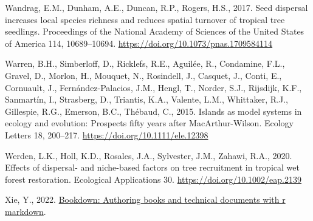 \documentclass[
  12pt,
]{article}
\newlength{\cslhangindent}
\newlength{\cslentryspacingunit} %
\newenvironment{CSLReferences}[2] %
 {%
  \setlength{\parindent}{0pt}
  \ifodd #1
  \let\oldpar\par
  \def\par{\hangindent=\cslhangindent\oldpar}
  \fi
  \setlength{\parskip}{#2\cslentryspacingunit}
 }%
 {}
\begin{document}
\begin{CSLReferences}{1}{0}
\leavevmode{}%
Wandrag, E.M., Dunham, A.E., Duncan, R.P., Rogers, H.S., 2017. Seed dispersal increases local species richness and reduces spatial turnover of tropical tree seedlings. Proceedings of the National Academy of Sciences of the United States of America 114, 10689--10694. \url{https://doi.org/10.1073/pnas.1709584114}

\leavevmode{}%
Warren, B.H., Simberloff, D., Ricklefs, R.E., Aguilée, R., Condamine, F.L., Gravel, D., Morlon, H., Mouquet, N., Rosindell, J., Casquet, J., Conti, E., Cornuault, J., Fernández-Palacios, J.M., Hengl, T., Norder, S.J., Rijsdijk, K.F., Sanmartín, I., Strasberg, D., Triantis, K.A., Valente, L.M., Whittaker, R.J., Gillespie, R.G., Emerson, B.C., Thébaud, C., 2015. Islands as model systems in ecology and evolution: Prospects fifty years after {MacArthur-Wilson}. Ecology Letters 18, 200--217. \url{https://doi.org/10.1111/ele.12398}

\leavevmode{}%
Werden, L.K., Holl, K.D., Rosales, J.A., Sylvester, J.M., Zahawi, R.A., 2020. Effects of dispersal- and niche-based factors on tree recruitment in tropical wet forest restoration. Ecological Applications 30. \url{https://doi.org/10.1002/eap.2139}

\leavevmode{}%
Xie, Y., 2022. \href{https://github.com/rstudio/bookdown}{Bookdown: Authoring books and technical documents with r markdown}.

\end{CSLReferences}
\end{document}
